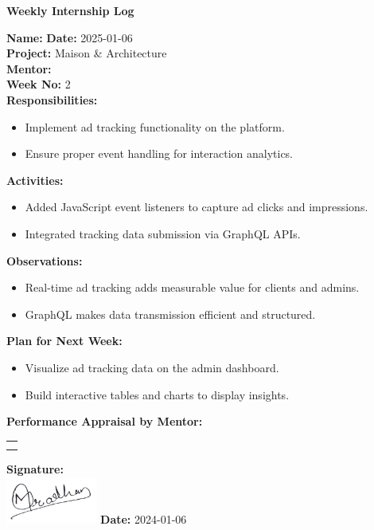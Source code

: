 \begin{center}
    \bfseries Weekly Internship Log
\end{center}

\noindent
\textbf{Name:}  \hfill \textbf{Date:} 2025-01-06 \\
\textbf{Project:} Maison \& Architecture \hfill \\
\textbf{Mentor:}  \\
\textbf{Week No:} 2 \\

\noindent
\textbf{Responsibilities:}
\begin{itemize}
    \item Implement ad tracking functionality on the platform.
    \item Ensure proper event handling for interaction analytics.
\end{itemize}

\noindent
\textbf{Activities:}
\begin{itemize}
    \item Added JavaScript event listeners to capture ad clicks and impressions.
    \item Integrated tracking data submission via GraphQL APIs.
\end{itemize}

\noindent
\textbf{Observations:}
\begin{itemize}
    \item Real-time ad tracking adds measurable value for clients and admins.
    \item GraphQL makes data transmission efficient and structured.
\end{itemize}

\noindent
\textbf{Plan for Next Week:}
\begin{itemize}
    \item Visualize ad tracking data on the admin dashboard.
    \item Build interactive tables and charts to display insights.
\end{itemize}

\noindent
\textbf{Performance Appraisal by Mentor:} \\
\begin{table}[h]
    \centering
    \noindent
    \begin{tabularx}{\textwidth} { 
        | >{\centering\arraybackslash}X| }

        \hline
        \\ \\
        \hline
    \end{tabularx}
\end{table}

\vfill
\noindent
\textbf{Signature:} \\
\includegraphics[width=3cm]{assets/nirajpradhan-sign.png} \hfill \textbf{Date:} 2024-01-06
